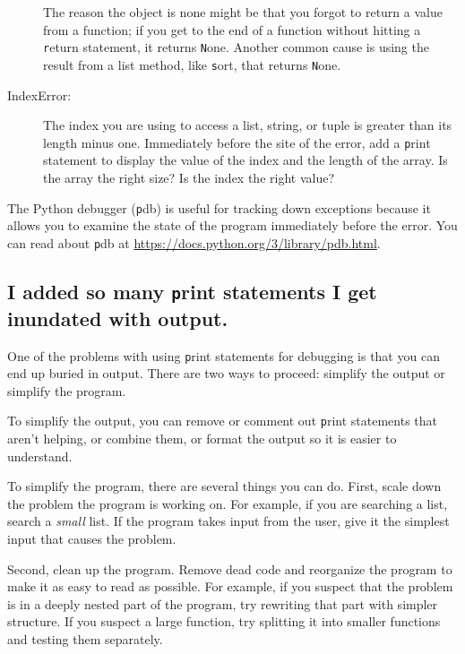 \documentclass[
DIV=11,
fontsize=12,
twoside,
headinclude=false,
titlepage=firstiscover,
abstract=true,
headsepline=true,
footsepline=true,
chapterprefix=true, %
headings=big,
bibliography=totoc,%
captions=tableheading
]{scrbook}
\theoremstyle{definition}
\begin{document}
\begin{description}
The reason the object is none might be that you forgot
to return a value from a function; if you get to the end of
a function without hitting a {\texttt return} statement, it returns
{\texttt None}.  Another common cause is using the result from
a list method, like {\texttt sort}, that returns {\texttt None}.

\item[IndexError:] The index you are using
to access a list, string, or tuple is greater than
its length minus one.  Immediately before the site of the error,
add a {\texttt print} statement to display
the value of the index and the length of the array.
Is the array the right size?  Is the index the right value?

\end{description}

The Python debugger ({\texttt pdb}) is useful for tracking down
exceptions because it allows you to examine the state of the
program immediately before the error.  You can read
about {\texttt pdb} at \url{https://docs.python.org/3/library/pdb.html}.


\subsection{I added so many {\texttt print} statements I get inundated with
output.}

One of the problems with using {\texttt print} statements for debugging
is that you can end up buried in output.  There are two ways
to proceed: simplify the output or simplify the program.

To simplify the output, you can remove or comment out {\texttt print}
statements that aren't helping, or combine them, or format
the output so it is easier to understand.

To simplify the program, there are several things you can do.  First,
scale down the problem the program is working on.  For example, if you
are searching a list, search a {\em small} list.  If the program takes
input from the user, give it the simplest input that causes the
problem.

Second, clean up the program.  Remove dead code and reorganize the
program to make it as easy to read as possible.  For example, if you
suspect that the problem is in a deeply nested part of the program,
try rewriting that part with simpler structure.  If you suspect a
large function, try splitting it into smaller functions and testing them
separately.
\end{document}
